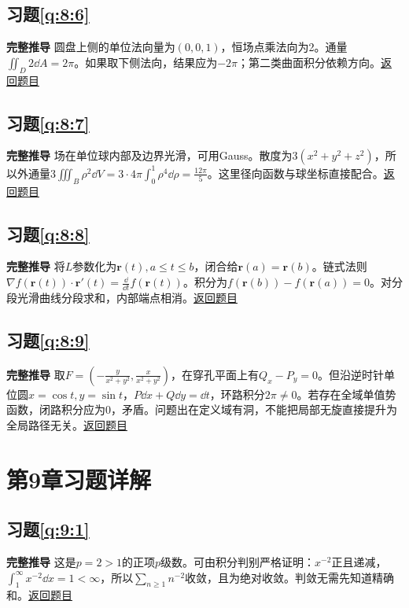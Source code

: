 \subsection*{习题\ref{q:8:6}}\label{a:8:6}\textbf{完整推导} 圆盘上侧的单位法向量为$(0,0,1)$，恒场点乘法向为2。通量$\iint_D2\dd A=2\pi$。如果取下侧法向，结果应为$-2\pi$；第二类曲面积分依赖方向。\quad\hyperref[q:8:6]{返回题目}

\subsection*{习题\ref{q:8:7}}\label{a:8:7}\textbf{完整推导} 场在单位球内部及边界光滑，可用Gauss。散度为$3(x^2+y^2+z^2)$，所以外通量$3\iiint_B\rho^2\dd V=3\cdot4\pi\int_0^1\rho^4\dd\rho=\frac{12\pi}{5}$。这里径向函数与球坐标直接配合。\quad\hyperref[q:8:7]{返回题目}

\subsection*{习题\ref{q:8:8}}\label{a:8:8}\textbf{完整推导} 将$L$参数化为$\bm r(t),a\le t\le b$，闭合给$\bm r(a)=\bm r(b)$。链式法则$\nabla f(\bm r(t))\cdot\bm r'(t)=\frac{\dd}{\dd t}f(\bm r(t))$。积分为$f(\bm r(b))-f(\bm r(a))=0$。对分段光滑曲线分段求和，内部端点相消。\quad\hyperref[q:8:8]{返回题目}

\subsection*{习题\ref{q:8:9}}\label{a:8:9}\textbf{完整推导} 取$F=(-\frac{y}{x^2+y^2},\frac{x}{x^2+y^2})$，在穿孔平面上有$Q_x-P_y=0$。但沿逆时针单位圆$x=\cos t,y=\sin t$，$P\dd x+Q\dd y=\dd t$，环路积分$2\pi\ne0$。若存在全域单值势函数，闭路积分应为0，矛盾。问题出在定义域有洞，不能把局部无旋直接提升为全局路径无关。\quad\hyperref[q:8:9]{返回题目}

\section{第9章习题详解}

\subsection*{习题\ref{q:9:1}}\label{a:9:1}\textbf{完整推导} 这是$p=2>1$的正项$p$级数。可由积分判别严格证明：$x^{-2}$正且递减，$\int_1^\infty x^{-2}\dd x=1<\infty$，所以$\sum_{n\ge1}n^{-2}$收敛，且为绝对收敛。判敛无需先知道精确和。\quad\hyperref[q:9:1]{返回题目}

